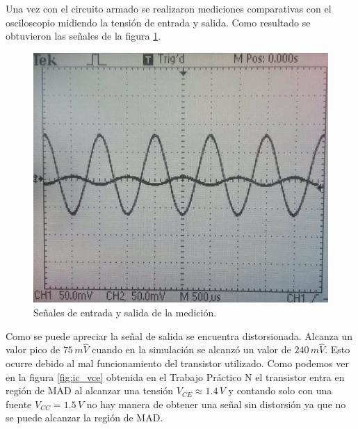 \documentclass[10pt,spanish,a4paper,openany,notitlepage]{article}
\begin{document}
Una vez con el circuito armado se realizaron mediciones comparativas
con el osciloscopio midiendo la tensión de entrada y salida. Como
resultado se obtuvieron las señales de la figura \ref{fig:medicion_entrada_salida}.

\begin{figure}[H]
\centering
\includegraphics[scale=0.8]{./imagenes/experimental_entrada_salida.jpg}
\caption{Señales de entrada y salida de la medición.}
\label{fig:medicion_entrada_salida}
\end{figure}

Como se puede apreciar la señal de salida se encuentra distorsionada. Alcanza
un valor pico de $75\, \unit{m\widehat{V}}$ cuando en la simulación se
alcanzó un valor de $240\, \unit{m\widehat{V}}$. Esto ocurre debido
al mal funcionamiento del transistor utilizado. Como podemos ver en la
figura \ref{fig:ic_vce} obtenida en el Trabajo Práctico N
el transistor entra en región de MAD al alcanzar una tensión 
$V_{CE} \approx 1.4\, \unit{V}$ y contando solo con una fuente $V_{CC} = 1.5\, \unit{V}$
no hay manera de obtener una señal sin distorsión ya que no se puede alcanzar
la región de MAD.
\end{document}

